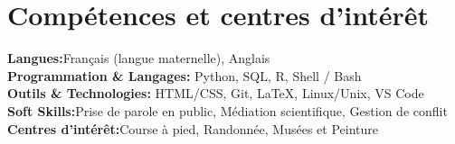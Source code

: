 \documentclass[letterpaper,11pt]{article}
\makeatletter
\newcommand{\resumeItem}[1]{
  \item\small{
    {#1 \vspace{-2pt}}
  }
}
\newcommand{\resumeProjectHeading}[2]{
    \item
    \begin{tabular*}{0.97\textwidth}{l@{\extracolsep{\fill}}r}
      \small#1 & #2 \\
    \end{tabular*}\vspace{-7pt}
}
\newcommand{\resumeSubHeadingListStart}{\begin{itemize}[leftmargin=0.15in, label={}]}
\newcommand{\resumeSubHeadingListEnd}{\end{itemize}}
\newcommand{\resumeItemListStart}{\begin{itemize}}
\newcommand{\resumeItemListEnd}{\end{itemize}\vspace{-5pt}}
\makeatother
\begin{document}





\section{Compétences et centres d'intérêt}
 \begin{itemize}[leftmargin=0.15in, label={}]
    \small{\item{
     \textbf{Langues:}{Français (langue maternelle), Anglais} \\
     \textbf{Programmation \& Langages:}{ Python, SQL, R, Shell / Bash} \\
\textbf{Outils \& Technologies:}{ HTML/CSS, Git, LaTeX, Linux/Unix, VS Code} \\
     \textbf{Soft Skills:}{Prise de parole en public, Médiation scientifique, Gestion de conflit} \\
     \textbf{Centres d'intérêt:}{Course à pied, Randonnée, Musées et Peinture}
    }}
 \end{itemize}
\end{document}
